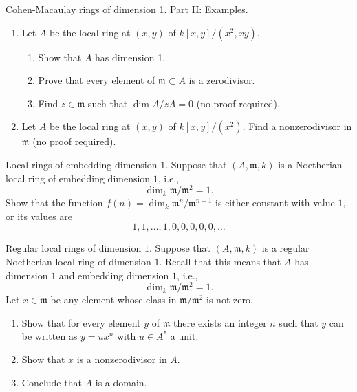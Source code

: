 \begin{exercise}
\label{exercise-CM-dim-1-II}
Cohen-Macaulay rings of dimension 1. Part II: Examples.
\begin{enumerate}
\item Let $A$ be the local ring at $(x, y)$ of $k[x, y]/(x^2, xy)$.
\begin{enumerate}
\item Show that $A$ has dimension 1.
\item Prove that every element of ${\mathfrak m}\subset A$ is a
zerodivisor.
\item Find $z\in {\mathfrak m}$ such that $\dim A/zA = 0$
(no proof required).
\end{enumerate}
\item Let $A$ be the local ring at $(x, y)$ of $k[x, y]/(x^2)$.
Find a nonzerodivisor in ${\mathfrak m}$ (no proof required).
\end{enumerate}
\end{exercise}

\begin{exercise}
\label{exercise-embedding-dim-1}
Local rings of embedding dimension $1$.
Suppose that $(A, {\mathfrak m}, k)$ is a Noetherian local ring
of embedding dimension $1$, i.e.,
$$
\dim_k {\mathfrak m}/{\mathfrak m}^2 = 1.
$$
Show that the function $f(n) = \dim_k {\mathfrak m}^n/{\mathfrak m}^{n + 1}$
is either constant with value $1$, or its values are
$$
1, 1, \ldots, 1, 0, 0, 0, 0, 0, \ldots
$$
\end{exercise}

\begin{exercise}
\label{exercise-regular-local-dim-1}
Regular local rings of dimension $1$.
Suppose that $(A, {\mathfrak m}, k)$ is a regular Noetherian local ring of
dimension $1$. Recall that this means that $A$ has dimension $1$
and embedding dimension $1$, i.e.,
$$
\dim_k {\mathfrak m}/{\mathfrak m}^2 = 1.
$$
Let $x\in{\mathfrak m}$ be any element whose class in ${\mathfrak m}/{\mathfrak
m}^2$ is not zero.
\begin{enumerate}
\item Show that for every element $y$
of ${\mathfrak m}$ there exists an integer $n$ such that $y$ can be written as
$y = ux^n$ with $u\in A^\ast$ a unit.
\item Show that $x$ is a nonzerodivisor in $A$.
\item Conclude that $A$ is a domain.
\end{enumerate}
\end{exercise}

